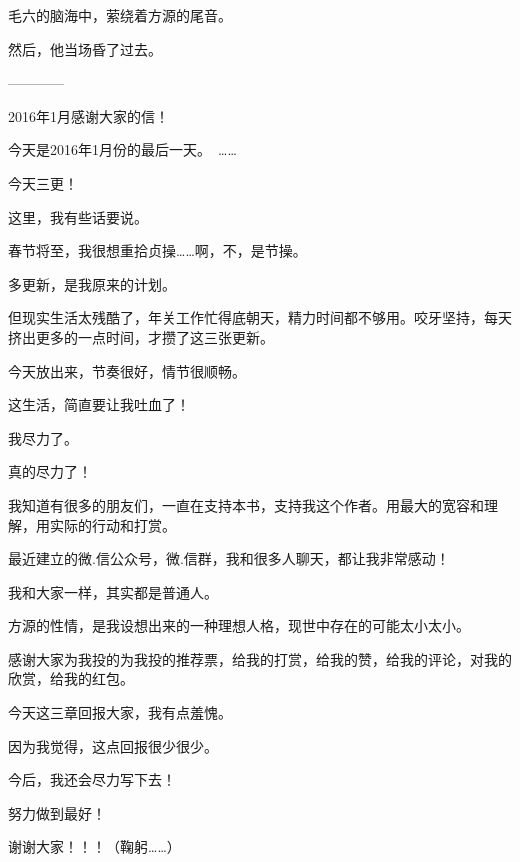 \begin{this_body}
毛六的脑海中，萦绕着方源的尾音。

然后，他当场昏了过去。

------------

2016年1月感谢大家的信！

今天是2016年1月份的最后一天。　……

今天三更！

这里，我有些话要说。

春节将至，我很想重拾贞操……啊，不，是节操。

多更新，是我原来的计划。

但现实生活太残酷了，年关工作忙得底朝天，精力时间都不够用。咬牙坚持，每天挤出更多的一点时间，才攒了这三张更新。

今天放出来，节奏很好，情节很顺畅。

这生活，简直要让我吐血了！

我尽力了。

真的尽力了！

我知道有很多的朋友们，一直在支持本书，支持我这个作者。用最大的宽容和理解，用实际的行动和打赏。

最近建立的微.信公众号，微.信群，我和很多人聊天，都让我非常感动！

我和大家一样，其实都是普通人。

方源的性情，是我设想出来的一种理想人格，现世中存在的可能太小太小。

感谢大家为我投的为我投的推荐票，给我的打赏，给我的赞，给我的评论，对我的欣赏，给我的红包。

今天这三章回报大家，我有点羞愧。

因为我觉得，这点回报很少很少。

今后，我还会尽力写下去！

努力做到最好！

谢谢大家！！！（鞠躬……）

\end{this_body}

